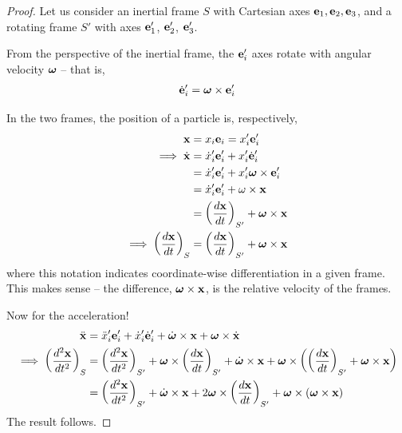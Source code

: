 \documentclass{../../template/note}
\begin{document}
    \begin{proof}
        Let us consider an inertial frame \(S\) with Cartesian axes \(\V e_1, \V e_2, \V e_3\), and a rotating frame \(S'\) with axes \(\V e_1'\), \(\V e_2'\), \(\V e_3'\). 

        From the perspective of the inertial frame, the \(\V e_i'\) axes rotate with angular velocity \(\V \omega\) -- that is,
        \begin{align*}
            \dot{\V e}_i' = \V \omega \times \V e_i'
        \end{align*}

        In the two frames, the position of a particle is, respectively,
        \begin{align*}
            \V x &= x_i \V e_i = x_i' \V e_i' \\
            \implies \dot{\V x} &=  \dot x_i' \V e'_i + x_i' \dot{\V e}_i' \\
            &= \dot x_i' \V e'_i + x_i' \V \omega \times \V e_i' \\
            &= \dot x_i' \V e'_i + \omega \times \V x \\
            &= \left(\frac{d\V x}{dt}\right)_{S'} + \V \omega \times \V x \\
            \implies \left(\frac{d\V x}{dt}\right)_S &= \left(\frac{d\V x}{dt}\right)_{S'} + \V \omega \times \V x
        \end{align*}
        where this notation indicates coordinate-wise differentiation in a given frame. This makes sense -- the difference, \(\V \omega \times \V x\), is the relative velocity of the frames.

        Now for the acceleration!
        \begin{align*}
            \ddot{\V x} &= \ddot x_i' \V e_i' + \dot x_i' \dot{\V e}_i' + \dot{\V \omega} \times \V x + \V \omega \times \dot{\V x} \\
            \implies \left(\frac{d^2\V x}{dt^2}\right)_S &= \left(\frac{d^2\V x}{dt^2}\right)_{S'} + \V \omega \times \left(\frac{d\V x}{dt}\right)_{S'} + \dot{\V \omega} \times \V x + \V \omega \times \left(\left(\frac{d\V x}{dt}\right)_{S'}+\V \omega \times \V x\right) \\
            &= \left(\frac{d^2\V x}{dt^2}\right)_{S'} + \dot{\V \omega} \times \V x + 2 \V \omega \times \left(\frac{d\V x}{dt}\right)_{S'} + \V \omega \times (\V \omega \times \V x)
        \end{align*}
        The result follows.
    \end{proof}
    
\end{document}

